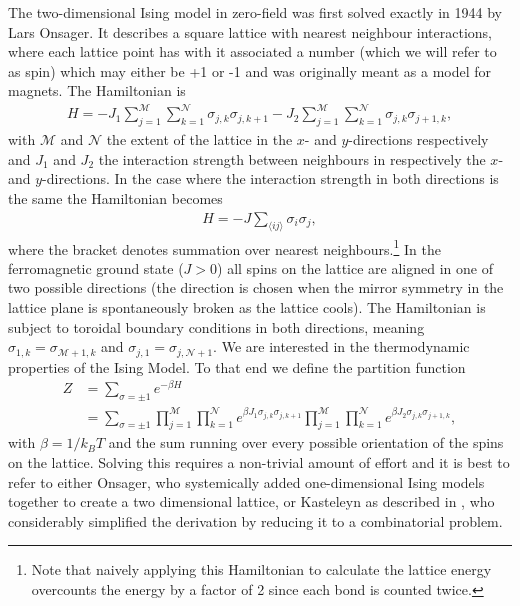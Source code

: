 \documentclass[11pt, a4paper]{report} %
\begin{document}
The two-dimensional Ising model in zero-field was first solved exactly in 1944 by Lars Onsager.\cite{onsager:1944}
It describes a square lattice with nearest neighbour interactions, where each lattice point has with it associated a number (which we will refer to as spin) which may either be +1 or -1 and was originally meant as a model for magnets.
The Hamiltonian is\cite{mccoy:1973}
\begin{align}
	H = -J_{1} \sum_{j=1}^{\mathcal{M}} \sum_{k=1}^{\mathcal{N}} \sigma_{j,k} \sigma_{j,k+1} - J_{2} \sum_{j=1}^{\mathcal{M}} \sum_{k=1}^{\mathcal{N}} \sigma_{j,k} \sigma_{j+1,k},
\end{align}
with \(\mathcal{M}\) and \(\mathcal{N}\) the extent of the lattice in the \(x\)- and \(y\)-directions respectively and \(J_{1}\) and \(J_{2}\) the interaction strength between neighbours in respectively the \(x\)- and \(y\)-directions.
In the case where the interaction strength in both directions is the same the Hamiltonian becomes\cite{newman:1999}
\begin{align}
	\label{eq:isotropic_hamiltonian}
	H = -J \sum_{\langle ij \rangle} \sigma_{i} \sigma_{j},
\end{align}
where the bracket denotes summation over nearest neighbours.\footnote{Note that naively applying this Hamiltonian to calculate the lattice energy overcounts the energy by a factor of 2 since each bond is counted twice.}
In the ferromagnetic ground state (\(J>0\)) all spins on the lattice are aligned in one of two possible directions (the direction is chosen when the mirror symmetry in the lattice plane is spontaneously broken as the lattice cools).
The Hamiltonian is subject to toroidal boundary conditions in both directions, meaning \(\sigma_{1,k} = \sigma_{\mathcal{M}+1,k}\) and \(\sigma_{j,1} = \sigma_{j,\mathcal{N}+1}\).
We are interested in the thermodynamic properties of the Ising Model.
To that end we define the partition function
\begin{align}
	Z &= \sum_{\sigma = \pm 1} e^{-\beta H} \\
	  &= \sum_{\sigma = \pm 1} \prod_{j=1}^{\mathcal{M}} \prod_{k=1}^{\mathcal{N}} e^{\beta J_1 \sigma_{j,k} \sigma_{j,k+1}} \prod_{j=1}^{\mathcal{M}} \prod_{k=1}^{\mathcal{N}} e^{\beta J_2 \sigma_{j,k} \sigma_{j+1,k}},
\end{align}
with \(\beta=1/k_B T\) and the sum running over every possible orientation of the spins on the lattice. Solving this requires a non-trivial amount of effort and it is best to refer to either Onsager\cite{onsager:1944}, who systemically added one-dimensional Ising models together to create a two dimensional lattice, or Kasteleyn as described in \cite{mccoy:1973}, who considerably simplified the derivation by reducing it to a combinatorial problem.
\end{document}
